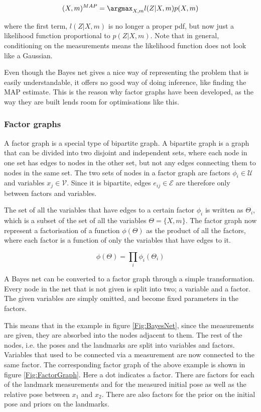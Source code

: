 \begin{equation}
    (X,m)^{MAP} = \argmax_{X,m}l(Z|X,m)p(X,m)
\end{equation}

where the first term, $l(Z|X,m)$ is no longer a proper pdf, but now just a likelihood function proportional to $p(Z|X,m)$. Note that in general, conditioning on the measurements means the likelihood function does not look like a Gaussian.

Even though the Bayes net gives a nice way of representing the problem that is easily understandable, it offers no good way of doing inference, like finding the \gls{MAP} estimate. This is the reason why factor graphs have been developed, as the way they are built lends room for optimisations like this.

\subsubsection{Factor graphs}

A factor graph is a special type of bipartite graph. A bipartite graph is a graph that can be divided into two disjoint and independent sets, where each node in one set has edges to nodes in the other set, but not any edges connecting them to nodes in the same set. The two sets of nodes in a factor graph are factors $\phi_i\in \mathcal{U}$ and variables $x_j\in \mathcal{V}$. Since it is bipartite, edges $e_{ij}\in \mathcal{E}$ are therefore only between factors and variables. 

The set of all the variables that have edges to a certain factor $\phi_i$ is written as $\Theta_i$, which is a subset of the set of all the variables $\Theta = \{X,m\}$. The factor graph now represent a factorisation of a function $\phi(\Theta)$ as the product of all the factors, where each factor is a function of only the variables that have edges to it.

\begin{equation}
    \phi(\Theta) = \prod_i \phi_i(\Theta_i)
\end{equation}

A Bayes net can be converted to a factor graph through a simple transformation. Every node in the net that is not given is split into two; a variable and a factor. The given variables are simply omitted, and become fixed parameters in the factors. 

This means that in the example in figure \ref{Fig:BayesNet}, since the measurements are given, they are absorbed into the nodes adjacent to them. The rest of the nodes, i.e. the poses and the landmarks are split into variables and factors. Variables that used to be connected via a measurement are now connected to the same factor. The corresponding factor graph of the above example is shown in figure \ref{Fig:FactorGraph}. Here a dot indicates a factor. There are factors for each of the landmark measurements and for the measured initial pose as well as the relative pose between $x_1$ and $x_2$. There are also factors for the prior on the initial pose and priors on the landmarks.

